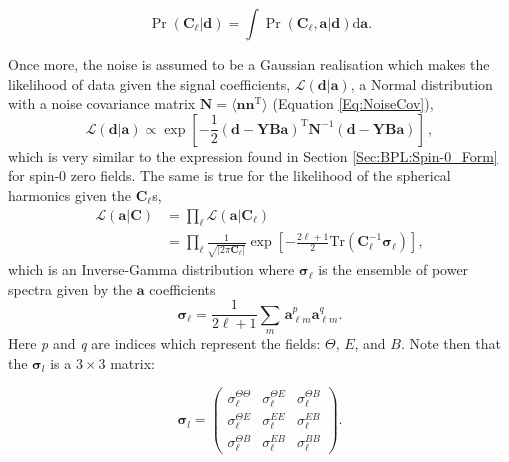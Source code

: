 \begin{equation}
\Pr(\mathbf{C}_{\ell}|\mathbf{d}) = \int \Pr(\mathbf{C}_{\ell},\mathbf{a}|\mathbf{d}) \text{d}\mathbf{a} .
\end{equation}


\qquad Once more, the noise is assumed to be a Gaussian realisation which makes the likelihood of data given the signal coefficients, $\mathcal{L}(\mathbf{d}|\mathbf{a})$, a Normal distribution with a noise covariance matrix $\mathbf{N}=\langle\mathbf{nn}^{\mathrm{T}} \rangle$ (Equation \ref{Eq:NoiseCov}),
\begin{equation}
\label{eqn::chCmbPol_Prda}
\mathcal{L}(\mathbf{d}|\mathbf{a}) \propto \exp \left[-\frac{1}{2}(\mathbf{d}-\mathbf{YBa})^{\mathrm{T}}\mathbf{N}^{-1}(\mathbf{d}-\mathbf{YBa}) \right]\, ,
\end{equation}
which is very similar to the expression found in Section \ref{Sec:BPL:Spin-0_Form} for spin-0 zero fields. The same is true for the likelihood of the spherical harmonics given the $\mathbf{C}_{\ell}$s,
\begin{align}
\mathcal{L}(\mathbf{a}|\mathbf{C}) & = \prod_{\ell} \mathcal{L}(\mathbf{a} | \mathbf{C}_{\ell}) \\ 
& = \prod_{\ell}\frac{1}{\sqrt{|2\pi\mathbf{C}_{\ell}|}}\exp\left[-\frac{2\ell+1}{2}\mathrm{Tr}(\mathbf{C}_{\ell}^{-1}\boldsymbol{\sigma}_{\ell})\right],
\end{align}
\noindent which is an Inverse-Gamma distribution where $\boldsymbol{\sigma}_{\ell}$ is the ensemble of power spectra given by the $\mathbf{a}$ coefficients
\begin{equation}
\boldsymbol{\sigma}_{\ell} = \frac{1}{2\ell+1}\sum_m\,\mathbf{a}^{p}_{\ell m}\mathbf{a}_{\ell m}^{q}.
\end{equation}
\noindent Here \textit{p} and \textit{q} are indices which represent the fields: $\Theta$, $E$, and $B$. Note then that the $\boldsymbol{\sigma}_l$ is a $3\times 3$ matrix:

\begin{equation}
\label{eqn::chCmbPol_defSigma_l}
\boldsymbol{\sigma}_l=\left(
\begin{array}{ccc}
\sigma_{\ell}^{\Theta\Theta} & \sigma_{\ell}^{\Theta E} & \sigma_{\ell}^{\Theta B} \\
\sigma_{\ell}^{\Theta E} & \sigma_{\ell}^{EE} & \sigma_{\ell}^{EB} \\
\sigma_{\ell}^{\Theta B} & \sigma_{\ell}^{EB} & \sigma_{\ell}^{BB}
\end{array} \right).
\end{equation}

